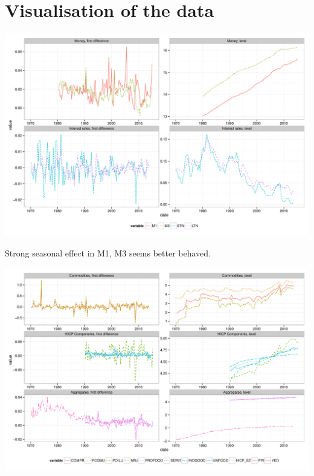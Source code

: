 \documentclass[11pt,oneside, a4paper]{amsart}\usepackage[]{graphicx}\usepackage[]{color}
\newenvironment{knitrout}{}{} %
\begin{document}
\section{Visualisation of the data}


\begin{knitrout}
\color{fgcolor}

{\centering \includegraphics[width=\textwidth]{figure/plot_moneyir-1} 

}



\end{knitrout}

Strong seasonal effect in M1, M3 seems better behaved. 


\begin{knitrout}
\color{fgcolor}

{\centering \includegraphics[width=\textwidth]{figure/plot_price-1} 

}



\end{knitrout}
\end{document}
